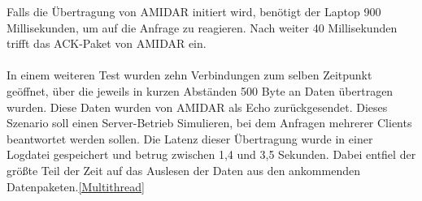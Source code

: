 Falls die Übertragung von AMIDAR initiert wird, benötigt der Laptop 900 Millisekunden, um auf die Anfrage zu reagieren. Nach weiter 40 Millisekunden trifft das ACK-Paket von AMIDAR ein.\\\\
In einem weiteren Test wurden zehn Verbindungen zum selben Zeitpunkt geöffnet, über die jeweils in kurzen Abständen 500 Byte an Daten übertragen wurden. Diese Daten wurden von AMIDAR als Echo zurückgesendet. Dieses Szenario soll einen Server-Betrieb Simulieren, bei dem Anfragen mehrerer Clients beantwortet werden sollen. Die Latenz dieser Übertragung wurde in einer Logdatei gespeichert und betrug zwischen 1,4 und 3,5 Sekunden. Dabei entfiel der größte Teil der Zeit auf das Auslesen der Daten aus den ankommenden Datenpaketen.\autoref{Multithread}\\

